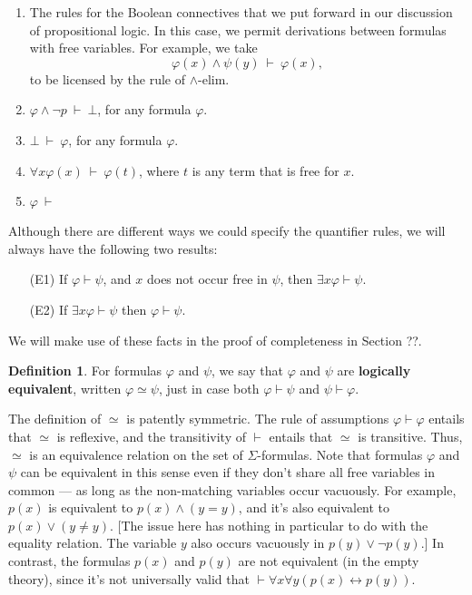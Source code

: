 \documentclass[11pt,fleqn]{article}
\theoremstyle{definition}
\newtheorem*{defn}{Definition}
\theoremstyle{remark}
\newcommand{\2}{\mathscr}
\renewcommand{\emph}{\textbf}
\newcommand{\vp}{\varphi}
\begin{document}
\begin{enumerate}
\item The rules for the Boolean connectives that we put forward in our
  discussion of propositional logic.  In this case, we permit
  derivations between formulas with free variables.  For example, we
  take
    \[ \vp (x)\wedge \psi (y) \: \vdash \: \vp (x) ,\] to be licensed
    by the rule of $\wedge$-elim.
  \item $\vp\wedge \neg p\:\vdash \: \bot$, for any formula $\vp$.
  \item $\bot \: \vdash \: \vp$, for any formula $\vp$.
  \item $\forall x\vp (x)\: \vdash \: \vp (t)$, where $t$ is any term
    that is free for $x$.
  \item $\vp \: \vdash $
\end{enumerate}



Although there are different ways we could specify the quantifier
rules, we will always have the following two results:
  \begin{enumerate}
  \item[(E1)] If $\vp\vdash \psi$, and $x$ does not occur free in
    $\psi$, then $\exists x\vp \vdash \psi$.
  \item[(E2)] If $\exists x\vp \vdash \psi$ then $\vp\vdash\psi$.
\end{enumerate}

We will make use of these facts in the proof of completeness in
Section ??.


\begin{defn} For formulas $\vp$ and $\psi$, we say that $\vp$ and
  $\psi$ are \emph{logically equivalent}, written $\vp\simeq\psi$,
  just in case both $\vp\vdash\psi$ and $\psi\vdash\vp$.
\end{defn}

The definition of $\simeq$ is patently symmetric.  The rule of
assumptions $\varphi\vdash\varphi$ entails that $\simeq$ is reflexive,
and the transitivity of $\vdash$ entails that $\simeq$ is transitive.
Thus, $\simeq$ is an equivalence relation on the set of
$\Sigma$-formulas.  Note that formulas $\vp$ and $\psi$ can be
equivalent in this sense even if they don't share all free variables
in common --- as long as the non-matching variables occur vacuously.
For example, $p(x)$ is equivalent to $p(x)\wedge (y=y)$, and it's also
equivalent to $p(x)\vee (y\neq y)$.  [The issue here has nothing in
particular to do with the equality relation.  The variable $y$ also
occurs vacuously in $p(y)\vee \neg p(y)$.]  In contrast, the formulas
$p(x)$ and $p(y)$ are not equivalent (in the empty theory), since it's
not universally valid that
$\vdash \forall x\forall y(p(x)\leftrightarrow p(y))$.
\end{document}
